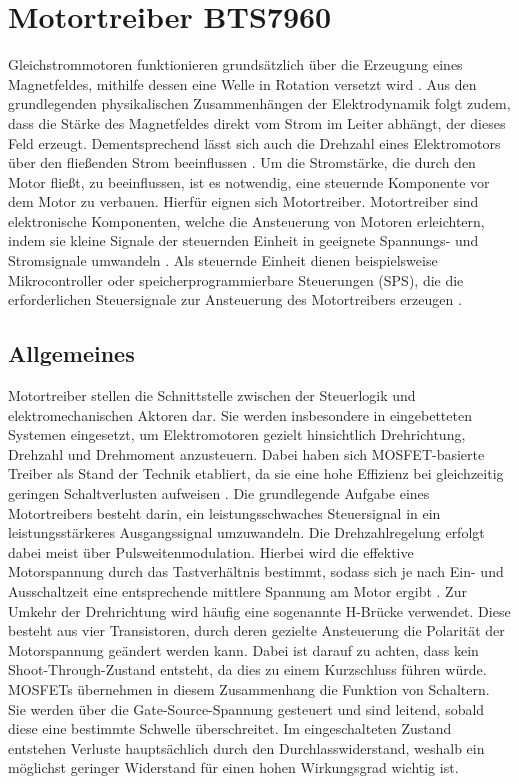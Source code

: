 %
%

\chapter{Motortreiber BTS7960}
Gleichstrommotoren funktionieren grundsätzlich über die Erzeugung eines Magnetfeldes, mithilfe dessen eine Welle in Rotation versetzt wird \cite{Roddeck:2023}.
Aus den grundlegenden physikalischen Zusammenhängen der Elektrodynamik folgt zudem, dass die Stärke des Magnetfeldes direkt vom Strom im Leiter abhängt, der dieses Feld erzeugt.
Dementsprechend lässt sich auch die Drehzahl eines Elektromotors über den fließenden Strom beeinflussen \cite{Feynman:2020}.
Um die Stromstärke, die durch den Motor fließt, zu beeinflussen, ist es notwendig, eine steuernde Komponente vor dem Motor zu verbauen. Hierfür eignen sich Motortreiber. Motortreiber sind elektronische Komponenten, welche die Ansteuerung von Motoren erleichtern, indem sie kleine Signale der steuernden Einheit in geeignete Spannungs- und Stromsignale umwandeln \cite{Roddeck:2023}. Als steuernde Einheit dienen beispielsweise Mikrocontroller oder speicherprogrammierbare Steuerungen (SPS), die die erforderlichen Steuersignale zur Ansteuerung des Motortreibers erzeugen \cite{Bartlett:2023a}.


\section{Allgemeines}

Motortreiber stellen die Schnittstelle zwischen der Steuerlogik und elektromechanischen Aktoren dar. Sie werden insbesondere in eingebetteten Systemen eingesetzt, um Elektromotoren gezielt hinsichtlich Drehrichtung, Drehzahl und Drehmoment anzusteuern. Dabei haben sich MOSFET-basierte Treiber als Stand der Technik etabliert, da sie eine hohe Effizienz bei gleichzeitig geringen Schaltverlusten aufweisen \cite{Bartlett:2023a}.
Die grundlegende Aufgabe eines Motortreibers besteht darin, ein leistungsschwaches Steuersignal in ein leistungsstärkeres Ausgangssignal umzuwandeln. Die Drehzahlregelung erfolgt dabei meist über Pulsweitenmodulation. Hierbei wird die effektive Motorspannung durch das Tastverhältnis bestimmt, sodass sich je nach Ein- und Ausschaltzeit eine entsprechende mittlere Spannung am Motor ergibt \cite{Bartlett:2023a}.
Zur Umkehr der Drehrichtung wird häufig eine sogenannte H-Brücke verwendet. Diese besteht aus vier Transistoren, durch deren gezielte Ansteuerung die Polarität der Motorspannung geändert werden kann. Dabei ist darauf zu achten, dass kein Shoot-Through-Zustand entsteht, da dies zu einem Kurzschluss führen würde.
MOSFETs übernehmen in diesem Zusammenhang die Funktion von Schaltern. Sie werden über die Gate-Source-Spannung gesteuert und sind leitend, sobald diese eine bestimmte Schwelle überschreitet. Im eingeschalteten Zustand entstehen Verluste hauptsächlich durch den Durchlasswiderstand, weshalb ein möglichst geringer Widerstand für einen hohen Wirkungsgrad wichtig ist.

